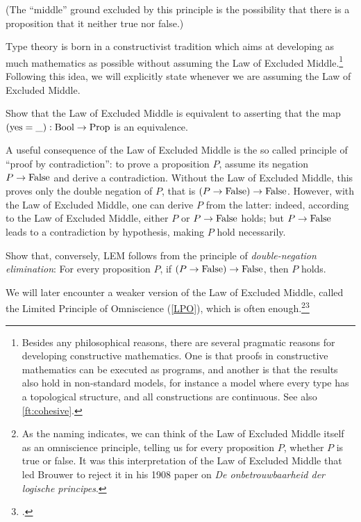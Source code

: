 (The ``middle'' ground excluded by this principle is the possibility that there
is a proposition that it neither true nor false.)

Type theory is born
in a constructivist tradition
which aims at developing as much mathematics as
possible without assuming the Law of Excluded Middle.\footnote{%
  Besides any philosophical reasons,
  there are several pragmatic reasons
  for developing constructive mathematics.
  One is that proofs in constructive mathematics
  can be executed as programs,
  and another is that the results also hold in non-standard models,
  for instance a model where every type has a topological structure,
  and all constructions are continuous.
  See also \cref{ft:cohesive}.}
Following this idea, we will
explicitly state whenever we are assuming the Law of Excluded Middle.
\begin{xca}\label{xca:lem-prop}
  Show that the Law of Excluded Middle is equivalent to asserting
  that the map $(\mathrm{yes} = \_) : \mathrm{Bool} \to \mathrm{Prop}$
  is an equivalence.
\end{xca}
A useful consequence of the Law of Excluded Middle is the so called principle of ``proof by
contradiction'': to prove a proposition $P$, assume its negation $P\to\mathrm{False}$
and derive a contradiction. Without the Law of Excluded Middle, this proves only the double negation of
$P$, that is $(P\to\mathrm{False})\to\mathrm{False}$.  However, with the Law of Excluded Middle, one can derive $P$
from the latter: indeed, according to the Law of Excluded Middle, either $P$ or $P\to \mathrm{False}$ holds;
but $P\to\mathrm{False}$ leads to a contradiction by hypothesis, making $P$ hold
necessarily.


\begin{xca}\label{xca:dne-lem}
  Show that, conversely, LEM follows from the principle of
  \emph{double-negation elimination}:
  For every proposition $P$, if $(P\to\mathrm{False})\to\mathrm{False}$, then $P$ holds.
\end{xca}

\begin{remark}
  We will later encounter a weaker version of the Law of Excluded Middle, called the Limited
  Principle of Omniscience (\cref{LPO}), which is often enough.\footnote{%
    As the naming indicates, we can think of the Law of Excluded Middle itself as an omniscience
    principle, telling us for every proposition $P$,
    whether $P$ is true or false.
    It was this interpretation of the Law of Excluded Middle that led Brouwer to reject it
    in his 1908 paper on \emph{De onbetrouwbaarheid der logische
      principes}.\footnotemark{}}\footcitetext{Brouwer-1908}
\end{remark}

